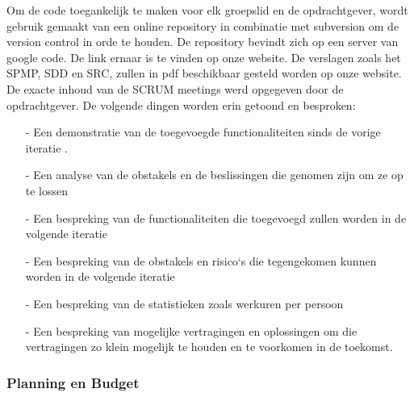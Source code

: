 \documentclass{article}
\begin{document}
Om de code toegankelijk te maken voor elk groepslid en de opdrachtgever, wordt gebruik gemaakt van een online repository in combinatie met subversion om de version control in orde te houden. De repository bevindt zich op een server van google code. De link ernaar is te vinden op onze website.
De verslagen zoals het SPMP, SDD en SRC, zullen in pdf beschikbaar gesteld worden op onze website.
De exacte inhoud van de SCRUM meetings werd opgegeven door de opdrachtgever. De volgende dingen worden erin getoond en besproken: \\[-5mm]
\begin{itemize}
 \item[-] Een demonstratie van de toegevoegde functionaliteiten sinds de vorige iteratie .\\[-5mm]
 \item[-] Een analyse van de obstakels en de beslissingen die genomen zijn om ze op te lossen\\[-5mm]
 \item[-] Een bespreking van de functionaliteiten die toegevoegd zullen worden in de volgende iteratie\\[-5mm]
 \item[-] Een bespreking van de obstakels en risico`s die tegengekomen kunnen worden in de volgende iteratie \\[-5mm]
 \item[-] Een bespreking van de statistieken zoals werkuren per persoon \\[-5mm]
 \item[-] Een bespreking van mogelijke vertragingen en oplossingen om die vertragingen zo klein mogelijk te houden en te voorkomen in de toekomst.\\[-5mm]
\end{itemize}



\subsubsection{Planning en Budget}

\end{document}
